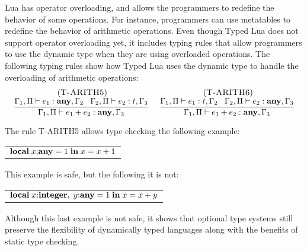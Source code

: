 Lua has operator overloading, and allows the programmers to redefine
the behavior of some operations.
For instance, programmers can use metatables to redefine the
behavior of arithmetic operations.
Even though Typed Lua does not support operator overloading yet,
it includes typing rules that allow programmers to use the
dynamic type when they are using overloaded operations.
The following typing rules show how Typed Lua uses the dynamic type
to handle the overloading of arithmetic operations:
\[
\begin{array}{c}
\begin{array}{c}
\; (\textsc{T-ARITH5})\\
\dfrac{\Gamma_{1}, \Pi \vdash e_{1}:\mathbf{any}, \Gamma_{2} \;\;\;
       \Gamma_{2}, \Pi \vdash e_{2}:t, \Gamma_{3}}
      {\Gamma_{1}, \Pi \vdash e_{1} + e_{2}:\mathbf{any}, \Gamma_{3}}
\end{array}
\;
\begin{array}{c}
\; (\textsc{T-ARITH6})\\
\dfrac{\Gamma_{1}, \Pi \vdash e_{1}:t, \Gamma_{2} \;\;\;
       \Gamma_{2}, \Pi \vdash e_{2}:\mathbf{any}, \Gamma_{3}}
      {\Gamma_{1}, \Pi \vdash e_{1} + e_{2}:\mathbf{any}, \Gamma_{3}}
\end{array}
\end{array}
\]

The rule \textsc{T-ARITH5} allows type checking the following
example:
\begin{center}
\begin{tabular}{l}
$\mathbf{local} \; x{:}\mathbf{any} = 1 \; \mathbf{in} \; x = x + 1$
\end{tabular}
\end{center}

This example is safe, but the following it is not:
\begin{center}
\begin{tabular}{l}
$\mathbf{local} \; x{:}\mathbf{integer}, \;y{:}\mathbf{any} = 1 \; \mathbf{in} \; x = x + y$
\end{tabular}
\end{center}

Although this last example is not safe, it shows that optional
type systems still preserve the flexibility of dynamically
typed languages along with the benefits of static type checking.
